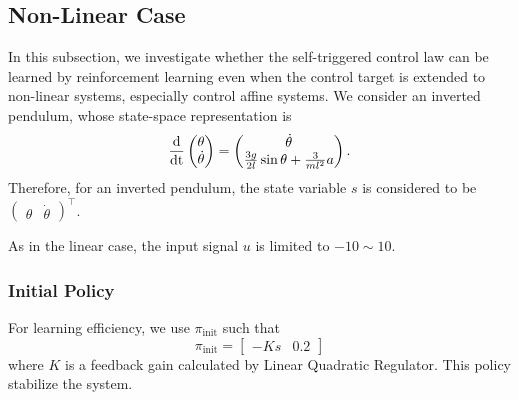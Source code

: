 \documentclass[english, dvipdfmx]{ampmt}             %
\newcommand{\odif}[2]{\frac{\rm{d}#1}{\rm{d}#2}}
\begin{document}
\subsection{Non-Linear Case}
In this subsection, we investigate whether the self-triggered control law can be learned by reinforcement learning even when the control target is extended to non-linear systems, especially control affine systems. We consider an inverted pendulum, whose state-space representation is
\begin{equation}
	\odif{}{t}\begin{pmatrix}\theta \\ \dot{\theta}\end{pmatrix} = 
		\begin{pmatrix}\dot{\theta} \\ \frac{3g}{2l}\sin{\theta} + \frac{3}{ml^2}a \end{pmatrix} \label{pendulum}.
\end{equation}
Therefore, for an inverted pendulum, the state variable $s$ is considered to be $\begin{pmatrix}\theta & \dot{\theta}\end{pmatrix}^{\top}$.
\par
As in the linear case, the input signal $u$ is limited to $-10 \sim 10$.

\subsubsection{Initial Policy}
For learning efficiency, we use $\pi_{\textrm{init}}$ such that
\begin{equation}
	\pi_{\textrm{init}} = \begin{bmatrix}-Ks&0.2\end{bmatrix}
\end{equation}
where $K$ is a feedback gain calculated by Linear Quadratic Regulator. This policy stabilize the system.
\end{document}
